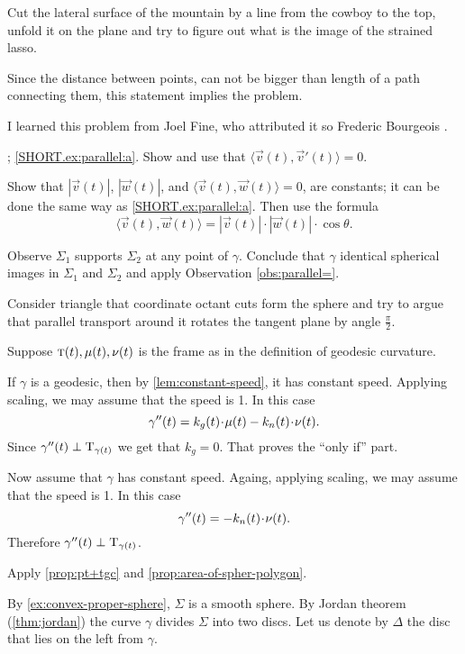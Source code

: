  Cut the lateral surface of the mountain by a line from the cowboy to the top, unfold it on the plane and try to figure out what is the image of the strained lasso.

Since the distance between points, can not be bigger than length of a path connecting them,
this statement implies the problem.


 I learned this problem from Joel Fine, who attributed it so Frederic Bourgeois \cite{fine}.

\parbf{\ref{ex:parallel}}; \ref{SHORT.ex:parallel:a}.
Show and use that $\langle\vec v(t),\vec v'(t)\rangle=0$.

\parit{\ref{SHORT.ex:parallel:b}}
Show that $|\vec v(t)|$, $|\vec w(t)|$, and
$\langle\vec v(t),\vec w(t)\rangle=0$,
are constants; it can be done the same way as \ref{SHORT.ex:parallel:a}.
Then use the formula 
\[\langle\vec v(t),\vec w(t)\rangle=|\vec v(t)|\cdot|\vec w(t)|\cdot\cos\theta.\]

Observe $\Sigma_1$ supports $\Sigma_2$ at any point of $\gamma$.
Conclude that $\gamma$ identical spherical images in $\Sigma_1$ and $\Sigma_2$ and apply Observation \ref{obs:parallel=}.

Consider triangle that coordinate octant cuts form the sphere and try to argue that parallel transport around it rotates the tangent plane by angle $\tfrac\pi 2$. 

Suppose $\textsc{t}(t),\mu(t),\nu(t)$ is the frame as in the definition of geodesic curvature.

If $\gamma$ is a geodesic, then by \ref{lem:constant-speed}, it has constant speed.
Applying scaling, we may assume that the speed is 1.
In this case 
\[\gamma''(t)=k_g(t)\cdot \mu(t)-k_n(t)\cdot \Norm(t).\]
Since $\gamma''(t)\perp\mathrm{T}_{\gamma(t)}$ we get that $k_g=0$. 
That proves the ``only if'' part.

Now assume that $\gamma$ has constant speed.
Againg, applying scaling, we may assume that the speed is 1.
In this case 
\[\gamma''(t)=-k_n(t)\cdot \Norm(t).\]
Therefore $\gamma''(t)\perp\mathrm{T}_{\gamma(t)}$.

Apply \ref{prop:pt+tgc} and \ref{prop:area-of-spher-polygon}.

By \ref{ex:convex-proper-sphere}, $\Sigma$ is a smooth sphere.
By Jordan theorem (\ref{thm:jordan}) the curve $\gamma$ divides $\Sigma$  into two discs.
Let us denote by $\Delta$ the disc that lies on the left from $\gamma$.

